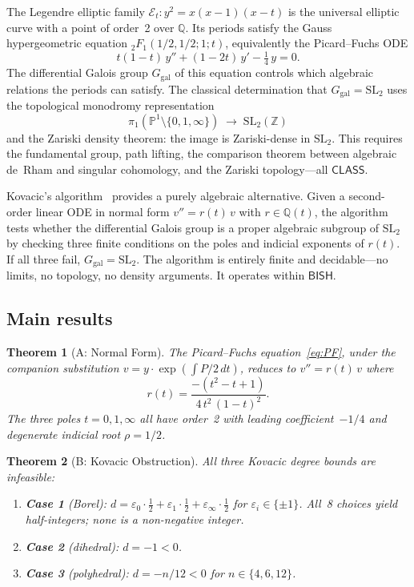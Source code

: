 \documentclass[11pt]{article}
\theoremstyle{plain}
\newtheorem{theorem}{Theorem}[section]
\theoremstyle{definition}
\theoremstyle{remark}
\newcommand{\Z}{\mathbb{Z}}
\newcommand{\Q}{\mathbb{Q}}
\newcommand{\SL}{\mathrm{SL}}
\newcommand{\Ggal}{G_{\mathrm{gal}}}
\newcommand{\BISH}{\mathsf{BISH}}
\newcommand{\CLASS}{\mathsf{CLASS}}
\begin{document}
The Legendre elliptic family $\mathcal{E}_t : y^2 = x(x-1)(x-t)$ is the universal elliptic curve with a point of order~2 over $\Q$.
Its periods satisfy the Gauss hypergeometric equation ${}_2F_1(1/2, 1/2; 1; t)$, equivalently the Picard--Fuchs ODE
\begin{equation}\label{eq:PF}
  t(1-t)\,y'' + (1-2t)\,y' - \tfrac{1}{4}\,y = 0.
\end{equation}
The differential Galois group $\Ggal$ of this equation controls which algebraic relations the periods can satisfy.
The classical determination that $\Ggal = \SL_2$ uses the topological monodromy representation
\[
  \pi_1(\mathbb{P}^1 \setminus \{0,1,\infty\}) \;\longrightarrow\; \SL_2(\Z)
\]
and the Zariski density theorem: the image is Zariski-dense in $\SL_2$.
This requires the fundamental group, path lifting, the comparison theorem between algebraic de~Rham and singular cohomology, and the Zariski topology---all $\CLASS$.

Kovacic's algorithm~\cite{Kovacic1986} provides a purely algebraic alternative.
Given a second-order linear ODE in normal form $v'' = r(t)\,v$ with $r \in \Q(t)$, the algorithm tests whether the differential Galois group is a proper algebraic subgroup of $\SL_2$ by checking three finite conditions on the poles and indicial exponents of $r(t)$.
If all three fail, $\Ggal = \SL_2$.
The algorithm is entirely finite and decidable---no limits, no topology, no density arguments.
It operates within $\BISH$.

\subsection{Main results}

\begin{theorem}[A: Normal Form]\label{thm:A}
The Picard--Fuchs equation~\eqref{eq:PF}, under the companion substitution $v = y \cdot \exp(\int P/2\,dt)$, reduces to $v'' = r(t)\,v$ where
\[
  r(t) = \frac{-(t^2 - t + 1)}{4\,t^2\,(1-t)^2}.
\]
The three poles $t = 0, 1, \infty$ all have order~2 with leading coefficient~$-1/4$ and degenerate indicial root $\rho = 1/2$.
\end{theorem}

\begin{theorem}[B: Kovacic Obstruction]\label{thm:B}
All three Kovacic degree bounds are infeasible:
\begin{enumerate}[label=(\roman*)]
  \item \textbf{Case 1} (Borel): $d = \varepsilon_0 \cdot \tfrac{1}{2} + \varepsilon_1 \cdot \tfrac{1}{2} + \varepsilon_\infty \cdot \tfrac{1}{2}$ for $\varepsilon_i \in \{\pm 1\}$.
  All~8 choices yield half-integers; none is a non-negative integer.
  \item \textbf{Case 2} (dihedral): $d = -1 < 0$.
  \item \textbf{Case 3} (polyhedral): $d = -n/12 < 0$ for $n \in \{4, 6, 12\}$.
\end{enumerate}
\end{theorem}
\end{document}
